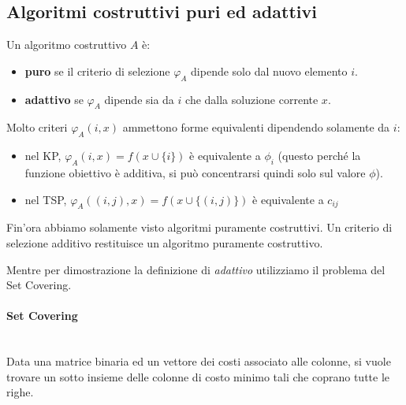 \documentclass{article}
\begin{document}
    \subsection{Algoritmi costruttivi puri ed adattivi}
    Un algoritmo costruttivo $A$ è:
    \begin{itemize}
        \item \textbf{puro} se il criterio di selezione $\varphi_A$ dipende solo dal nuovo elemento $i$.
        \item \textbf{adattivo} se $\varphi_A$ dipende sia da $i$ che dalla soluzione corrente $x$.
    \end{itemize}
    Molto criteri $\varphi_A (i,x)$ ammettono forme equivalenti dipendendo solamente da $i$:
    \begin{itemize}
        \item nel KP, $\varphi_A(i,x) = f(x\cup\{i\})$ è equivalente a $\phi_i$ (questo perché la funzione obiettivo
              è additiva, si può concentrarsi quindi solo sul valore $\phi$).
        \item nel TSP, $\varphi_A((i,j),x)=f(x\cup\{(i,j)\})$ è equivalente a $c_{ij}$
    \end{itemize}
    Fin'ora abbiamo solamente visto algoritmi puramente costruttivi. Un criterio di selezione additivo
    restituisce un algoritmo puramente costruttivo.

    Mentre per dimostrazione la definizione di \textit{adattivo} utilizziamo il problema del Set Covering.

    \paragraph{Set Covering}\mbox{}\\
    Data una matrice binaria ed un vettore dei costi associato alle colonne, si vuole trovare un sotto insieme
    delle colonne di costo minimo tali che coprano tutte le righe.
\end{document}
